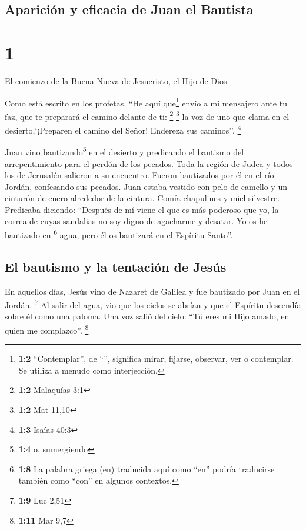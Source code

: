 \hypertarget{apariciuxf3n-y-eficacia-de-juan-el-bautista}{%
\subsection{Aparición y eficacia de Juan el
Bautista}\label{apariciuxf3n-y-eficacia-de-juan-el-bautista}}

\hypertarget{section}{%
\section{1}\label{section}}

 El comienzo de la Buena Nueva de Jesucristo, el Hijo de
Dios.

 Como está escrito en los profetas, ``He aquí
que\footnote{\textbf{1:2} ``Contemplar'', de ``'', significa
  mirar, fijarse, observar, ver o contemplar. Se utiliza a menudo como
  interjección.} envío a mi mensajero ante tu faz, que te preparará el
camino delante de ti: \footnote{\textbf{1:2} Malaquías 3:1} \footnote{\textbf{1:2}
  Mat 11,10}  la voz de uno que clama en el
desierto,`¡Preparen el camino del Señor! Endereza sus caminos''.
\footnote{\textbf{1:3} Isaías 40:3}

 Juan vino bautizando\footnote{\textbf{1:4} o, sumergiendo}
en el desierto y predicando el bautismo del arrepentimiento para el
perdón de los pecados.  Toda la región de Judea y todos
los de Jerusalén salieron a su encuentro. Fueron bautizados por él en el
río Jordán, confesando sus pecados.  Juan estaba vestido
con pelo de camello y un cinturón de cuero alrededor de la cintura.
Comía chapulines y miel silvestre.  Predicaba diciendo:
``Después de mí viene el que es más poderoso que yo, la correa de cuyas
sandalias no soy digno de agacharme y desatar.  Yo os he
bautizado en \footnote{\textbf{1:8} La palabra griega (en) traducida
  aquí como ``en'' podría traducirse también como ``con'' en algunos
  contextos.} agua, pero él os bautizará en el Espíritu Santo''.

\hypertarget{el-bautismo-y-la-tentaciuxf3n-de-jesuxfas}{%
\subsection{El bautismo y la tentación de
Jesús}\label{el-bautismo-y-la-tentaciuxf3n-de-jesuxfas}}

 En aquellos días, Jesús vino de Nazaret de Galilea y fue
bautizado por Juan en el Jordán. \footnote{\textbf{1:9} Luc 2,51}
 Al salir del agua, vio que los cielos se abrían y que el
Espíritu descendía sobre él como una paloma.  Una voz
salió del cielo: ``Tú eres mi Hijo amado, en quien me complazco''.
\footnote{\textbf{1:11} Mar 9,7}

